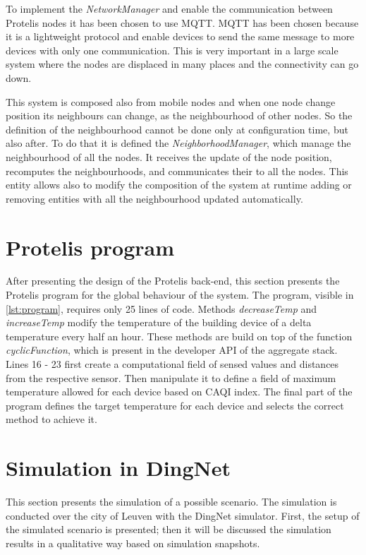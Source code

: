 \noindent To implement the \mbox{\textit{NetworkManager}} and enable the communication between Protelis nodes it has been chosen to use MQTT.
MQTT has been chosen because it is a lightweight protocol and enable devices to send the same message to more devices with only one communication.
This is very important in a large scale system where the nodes are displaced in many places and the connectivity can go down.

\noindent This system is composed also from mobile nodes and when one node change position its neighbours can change, as the neighbourhood of other nodes. 
So the definition of the neighbourhood cannot be done only at configuration time, but also after.
To do that it is defined the \mbox{\textit{NeighborhoodManager}}, which manage the neighbourhood of all the nodes.
It receives the update of the node position, recomputes the neighbourhoods, and communicates their to all the nodes. 
This entity allows also to modify the composition of the system at runtime adding or removing entities with all the neighbourhood updated automatically.

\section{Protelis program}
After presenting the design of the Protelis back-end, this section presents the Protelis program for the global behaviour of the system. 
The program, visible in \autoref{lst:program}, requires only 25 lines of code.
Methods \mbox{\textit{decreaseTemp}} and \mbox{\textit{increaseTemp}} modify the temperature of the building device of a delta temperature every half an hour.
These methods are build on top of the function \mbox{\textit{cyclicFunction}}, which is present in the developer API of the aggregate stack.
Lines 16 - 23 first create a computational field of sensed values and distances from the respective sensor. Then manipulate it to define a field of maximum temperature allowed for each device based on CAQI index.
The final part of the program defines the target temperature for each device and selects the correct method to achieve it. 



\section{Simulation in DingNet}
This section presents the simulation of a possible scenario. 
The simulation is conducted over the city of Leuven with the DingNet simulator.
First, the setup of the simulated scenario is presented; then it will be discussed the simulation results in a qualitative way based on simulation snapshots.

